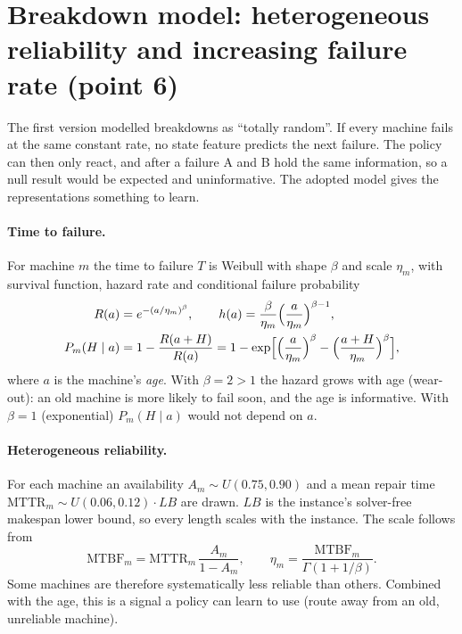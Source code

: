 \documentclass[11pt,a4paper]{article}
\begin{document}
\section{Breakdown model: heterogeneous reliability and increasing failure rate (point 6)}
\label{sec:breakdowns}

The first version modelled breakdowns as ``totally random''. If every machine fails at the same
constant rate, no state feature predicts the next failure. The policy can then only react, and
after a failure A and B hold the same information, so a null result would be expected and
uninformative. The adopted model gives the representations something to learn.

\paragraph{Time to failure.} For machine $m$ the time to failure $T$ is Weibull with shape $\beta$
and scale $\eta_m$, with survival function, hazard rate and conditional failure probability
\begin{align*}
  R(a)&=e^{-(a/\eta_m)^\beta},\qquad
  h(a)=\frac{\beta}{\eta_m}\Bigl(\frac{a}{\eta_m}\Bigr)^{\beta-1},\\
  P_m(H\mid a)&=1-\frac{R(a+H)}{R(a)}
  =1-\exp\Bigl[\Bigl(\frac{a}{\eta_m}\Bigr)^{\beta}-\Bigl(\frac{a+H}{\eta_m}\Bigr)^{\beta}\Bigr],
\end{align*}
where $a$ is the machine's \emph{age}. With $\beta=2>1$ the hazard grows with age (wear-out):
an old machine is more likely to fail soon, and the age is informative. With $\beta=1$
(exponential) $P_m(H\mid a)$ would not depend on $a$.

\paragraph{Heterogeneous reliability.} For each machine an availability
$A_m\sim U(0.75,0.90)$ and a mean repair time $\mathrm{MTTR}_m\sim U(0.06,0.12)\cdot LB$ are
drawn. $LB$ is the instance's solver-free makespan lower bound, so every length scales with the
instance. The scale follows from
\[
  \mathrm{MTBF}_m=\mathrm{MTTR}_m\,\frac{A_m}{1-A_m},\qquad
  \eta_m=\frac{\mathrm{MTBF}_m}{\Gamma(1+1/\beta)}.
\]
Some machines are therefore systematically less reliable than others. Combined with the age,
this is a signal a policy can learn to use (route away from an old, unreliable machine).
\end{document}
